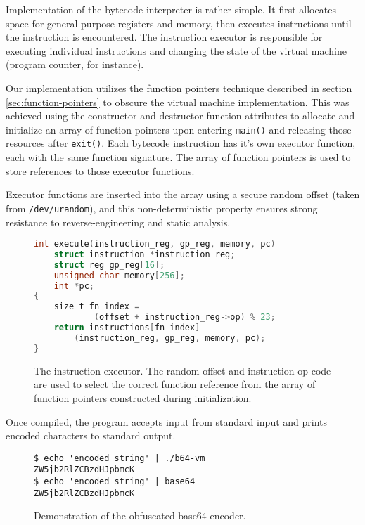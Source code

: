 \documentclass[conference]{IEEEtran}
\begin{document}
Implementation of the bytecode interpreter is rather simple. It first allocates space for general-purpose registers and memory, then executes instructions until the  instruction is encountered. The instruction executor is responsible for executing individual instructions and changing the state of the virtual machine (program counter, for instance).

Our implementation utilizes the function pointers technique described in section \ref{sec:function-pointers} to obscure the virtual machine implementation. This was achieved using the constructor and destructor function attributes to allocate and initialize an array of function pointers upon entering \texttt{main()} and releasing those resources after \texttt{exit()}. Each bytecode instruction has it's own executor function, each with the same function signature. The array of function pointers is used to store references to those executor functions.

Executor functions are inserted into the array using a secure random offset (taken from \texttt{/dev/urandom}), and this non-deterministic property ensures strong resistance to reverse-engineering and static analysis.

\begin{figure}[h]
\begin{lstlisting}[language=C,basicstyle=\footnotesize,mathescape=true]
int execute(instruction_reg, gp_reg, memory, pc)
	struct instruction *instruction_reg;
	struct reg gp_reg[16];
	unsigned char memory[256];
	int *pc;
{
	size_t fn_index =
	        (offset + instruction_reg->op) % 23;
	return instructions[fn_index]
	    (instruction_reg, gp_reg, memory, pc);
}
\end{lstlisting}
\caption{The instruction executor. The random offset and instruction op code are used to select the correct function reference from the array of function pointers constructed during initialization.}
\label{fig:vm-instruction-executor}
\end{figure}

Once compiled, the program accepts input from standard input and prints encoded characters to standard output.

\begin{figure}[h]
\begin{lstlisting}[basicstyle=\footnotesize]
$ echo 'encoded string' | ./b64-vm
ZW5jb2RlZCBzdHJpbmcK
$ echo 'encoded string' | base64
ZW5jb2RlZCBzdHJpbmcK
\end{lstlisting}
\caption{Demonstration of the obfuscated base64 encoder.}
\label{fig:vm-usage-example}
\end{figure}
\end{document}
